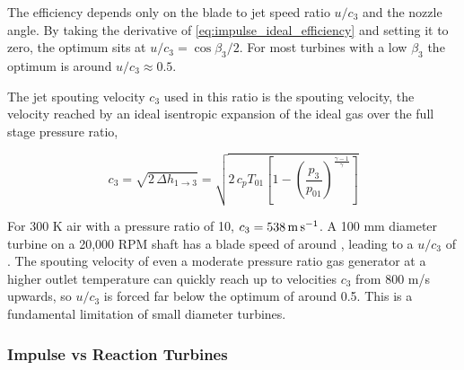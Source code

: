 The efficiency depends only on the blade to jet speed ratio $u/c_3$ and the nozzle angle. By taking the derivative of \cref{eq:impulse_ideal_efficiency} and setting it to zero, the optimum sits at $u/c_3 = \cos\beta_3/2$. For most turbines with a low $\beta_3$ the optimum is around $u/c_3\approx0.5$.





The jet spouting velocity $c_3$ used in this ratio is the spouting velocity, the velocity reached by an ideal isentropic expansion of the ideal gas over the full stage pressure ratio,

\begin{equation}
    c_3 = \sqrt{2\,\Delta h_{1\rightarrow 3}}
    = \sqrt{2\, c_p T_{01} \left[1 - \left(\frac{p_3}{p_{01}}\right)^{\frac{\gamma-1}{\gamma}}\right]}
    \label{eq:spouting_velocity}
\end{equation}

For 300 K air with a pressure ratio of 10, $c_3 = \qty{538}{\meter\per\second}$. A 100 mm diameter turbine on a 20,000 RPM shaft has a blade speed of around \valTurbexU, leading to a $u/c_3$ of \valTurbexUCThree. The spouting velocity of even a moderate pressure ratio gas generator at a higher outlet temperature can quickly reach up to velocities $c_3$ from 800 m/s upwards, so $u/c_3$ is forced far below the optimum of around 0.5. This is a fundamental limitation of small diameter turbines.

\subsubsection{Impulse vs Reaction Turbines}
\label{subsubsec:impulse_vs_reaction}

